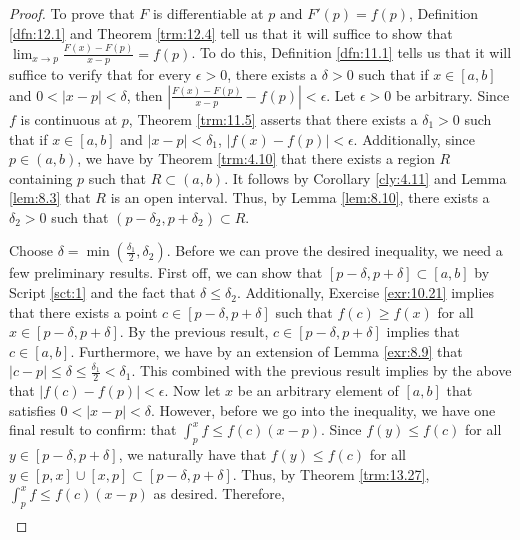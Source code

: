 \documentclass[../main.tex]{subfiles}
\begin{document}
\begin{theorem}
\begin{proof}


        To prove that $F$ is differentiable at $p$ and $F'(p)=f(p)$, Definition \ref{dfn:12.1} and Theorem \ref{trm:12.4} tell us that it will suffice to show that $\lim_{x\to p}\frac{F(x)-F(p)}{x-p}=f(p)$. To do this, Definition \ref{dfn:11.1} tells us that it will suffice to verify that for every $\epsilon>0$, there exists a $\delta>0$ such that if $x\in[a,b]$ and $0<|x-p|<\delta$, then $|\frac{F(x)-F(p)}{x-p}-f(p)|<\epsilon$. Let $\epsilon>0$ be arbitrary. Since $f$ is continuous at $p$, Theorem \ref{trm:11.5} asserts that there exists a $\delta_1>0$ such that if $x\in[a,b]$ and $|x-p|<\delta_1$, $|f(x)-f(p)|<\epsilon$. Additionally, since $p\in(a,b)$, we have by Theorem \ref{trm:4.10} that there exists a region $R$ containing $p$ such that $R\subset(a,b)$. It follows by Corollary \ref{cly:4.11} and Lemma \ref{lem:8.3} that $R$ is an open interval. Thus, by Lemma \ref{lem:8.10}, there exists a $\delta_2>0$ such that $(p-\delta_2,p+\delta_2)\subset R$.\par
        Choose $\delta=\min(\frac{\delta_1}{2},\delta_2)$. Before we can prove the desired inequality, we need a few preliminary results. First off, we can show that $[p-\delta,p+\delta]\subset[a,b]$ by Script \ref{sct:1} and the fact that $\delta\leq\delta_2$. Additionally, Exercise \ref{exr:10.21} implies that there exists a point $c\in[p-\delta,p+\delta]$ such that $f(c)\geq f(x)$ for all $x\in[p-\delta,p+\delta]$. By the previous result, $c\in[p-\delta,p+\delta]$ implies that $c\in[a,b]$. Furthermore, we have by an extension of Lemma \ref{exr:8.9} that $|c-p|\leq\delta\leq\frac{\delta_1}{2}<\delta_1$. This combined with the previous result implies by the above that $|f(c)-f(p)|<\epsilon$. Now let $x$ be an arbitrary element of $[a,b]$ that satisfies $0<|x-p|<\delta$. However, before we go into the inequality, we have one final result to confirm: that $\int_p^xf\leq f(c)(x-p)$. Since $f(y)\leq f(c)$ for all $y\in[p-\delta,p+\delta]$, we naturally have that $f(y)\leq f(c)$ for all $y\in[p,x]\cup[x,p]\subset[p-\delta,p+\delta]$. Thus, by Theorem \ref{trm:13.27}, $\int_p^xf\leq f(c)(x-p)$ as desired. Therefore,
        \begingroup
        \allowdisplaybreaks
        \begin{align*}

\end{align*}
\end{proof}
\end{theorem}
\end{document}

